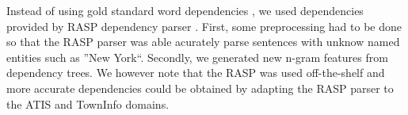 \documentclass{article}
\begin{document}
Instead of using gold standard word dependencies \cite{kate08}, we used dependencies provided by RASP dependency parser \cite{rasp06}. First, some preprocessing had to be done so that the RASP parser was able acurately parse sentences with unknow named entities such as ''New York``. 
Secondly, we generated new n-gram features from dependency trees. 
We however note that the RASP was used off-the-shelf and more accurate dependencies could be obtained by adapting the RASP parser to the ATIS and TownInfo domains.

\end{document}
